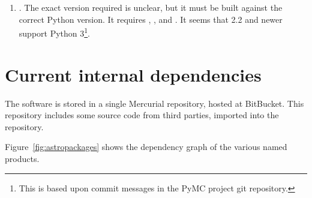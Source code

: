 \documentclass{memarticle}
\newcommand{\despipe}{\name{des-pipe}\xspace}
\begin{document}
\begin{enumerate}
  be built against the correct Python version.  requires
   for full utility, but can work without it; it also
  requires . As of version 1.1,  is compatible
  with Python 3. The version current as May~7, 2013 is 1.2.
\item {}. The exact version required is unclear, but it must be
  built against the correct Python version. It requires ,
  , and . It seems that  2.2 and
  newer support Python 3\footnote{This is based upon commit messages in
    the PyMC project git repository.}.
\end{enumerate}

\section{Current internal dependencies}

The \despipe software is stored in a single
Mercurial\cite{mercurial} repository, hosted at
BitBucket\cite{bitbucket}. This repository includes some source code
from third parties, imported into the repository.

Figure~\ref{fig:astropackages} shows the dependency graph of the various
named products.
\end{document}
